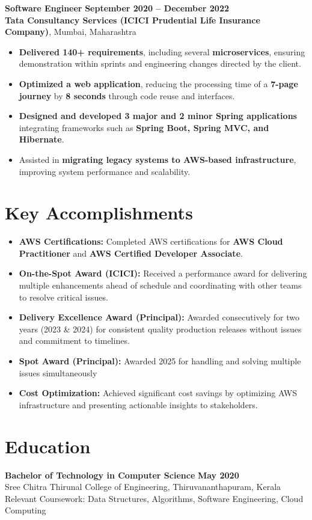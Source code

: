 \documentclass[a4paper,10pt]{article}
\begin{document}
    \textbf{Software Engineer} \hfill \textbf{September 2020 -- December 2022} \\
    \textbf{Tata Consultancy Services (ICICI Prudential Life Insurance Company)}, Mumbai, Maharashtra
    \begin{itemize}[left=0em]
        \item \textbf{Delivered 140+ requirements}, including several \textbf{microservices}, ensuring demonstration within sprints and engineering changes directed by the client.
        \item \textbf{Optimized a web application}, reducing the processing time of a \textbf{7-page journey} by \textbf{8 seconds} through code reuse and interfaces.
        \item \textbf{Designed and developed 3 major and 2 minor Spring applications} integrating frameworks such as \textbf{Spring Boot, Spring MVC, and Hibernate}.
        \item Assisted in \textbf{migrating legacy systems to AWS-based infrastructure}, improving system performance and scalability.
    \end{itemize}

\section*{Key Accomplishments}
\begin{itemize}[left=0em]
    \item \textbf{AWS Certifications:} Completed AWS certifications for \textbf{AWS Cloud Practitioner} and \textbf{AWS Certified Developer Associate}.
    \item \textbf{On-the-Spot Award (ICICI):} Received a performance award for delivering multiple enhancements ahead of schedule and coordinating with other teams to resolve critical issues.
    \item \textbf{Delivery Excellence Award (Principal):} Awarded consecutively for two years (2023 \& 2024) for consistent quality production releases without issues and commitment to timelines.
    \item \textbf{Spot Award (Principal):} Awarded 2025 for handling and solving multiple issues simultaneously
    \item \textbf{Cost Optimization:} Achieved significant cost savings by optimizing AWS infrastructure and presenting actionable insights to stakeholders.
\end{itemize}

\section*{Education}
\textbf{Bachelor of Technology in Computer Science} \hfill \textbf{May 2020} \\
Sree Chitra Thirunal College of Engineering, Thiruvananthapuram, Kerala \\
Relevant Coursework: Data Structures, Algorithms, Software Engineering, Cloud Computing
\end{document}
